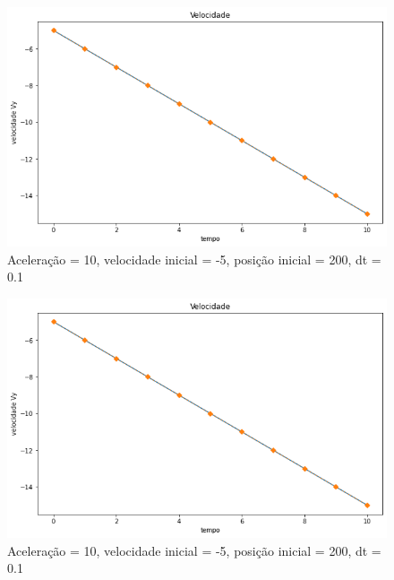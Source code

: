 \documentclass[12pt]{article}
\begin{document}
\begin{figure}[H]
  \centering
  \includegraphics[scale = 0.6]{imagens/dt=0.1 tf=1 velocidade em y.png}
  \caption{Aceleração = 10, velocidade inicial = -5, posição inicial = 200, dt = 0.1}
\end{figure}
\begin{figure}[H]
  \centering
  \includegraphics[scale = 0.6]{imagens/dt=0.1 tf=1 velocidade em y.png}
  \caption{Aceleração = 10, velocidade inicial = -5, posição inicial = 200, dt = 0.1}
\end{figure}
\end{document}
